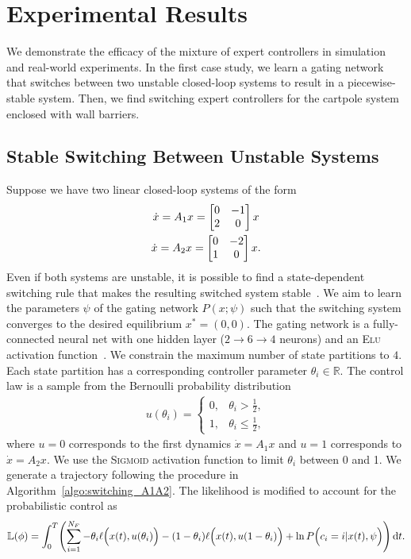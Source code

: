 \section{Experimental Results}
\label{sec:moe_results}
We demonstrate the efficacy of the mixture of expert controllers in simulation
and real-world experiments.
%
In the first case study, we learn a gating network that switches between two
unstable closed-loop systems to result in a piecewise-stable system.
%
Then, we find switching expert controllers for the cartpole system enclosed with
wall barriers.
%

\subsection{Stable Switching Between Unstable Systems}

Suppose we have two linear closed-loop systems of the form 
\begin{equation}
    \begin{gathered}
        \dot{x} = A_1x = \begin{bmatrix}0 & -1 \\ 2 & 0\end{bmatrix}x \\
        \dot{x} = A_2x = \begin{bmatrix}0 & -2 \\ 1 & 0\end{bmatrix}x.
    \end{gathered}
    \label{eq:unstable_closedloop}
\end{equation}
%
Even if both systems are unstable, it is possible to find a state-dependent
switching rule that makes the resulting switched system
stable~\cite{liberzon2003switching}. 
%
We aim to learn the parameters $\psi$ of the gating network $P(x;
\psi)$ such that the switching system converges to the desired equilibrium $x^*
= (0, 0)$.
%
The gating network is a fully-connected neural net with one hidden layer ($2
\rightarrow 6 \rightarrow 4$ neurons) and an \textsc{Elu} activation
function~\cite{clevert2015fast}.
%
We constrain the maximum number of state partitions to $4$.
%
Each state partition has a corresponding controller parameter $\theta_i \in
\mathbb{R}$. 
%
The control law is a sample from the Bernoulli probability distribution
\begin{align}
    u(\theta_i) = \begin{cases}
       0, & \theta_i > \frac{1}{2}, \\
       1, & \theta_i \leq \frac{1}{2},
    \end{cases}
\end{align}
\noindent where $u = 0$ corresponds to the first dynamics $\dot{x} = A_1
x$ and $u=1$ corresponds to $\dot{x} = A_2x$.
%
We use the \textsc{Sigmoid} activation function to limit $\theta_i$ between 0
and 1.
%
We generate a trajectory following the procedure in
Algorithm~\eqref{algo:switching_A1A2}.
%
The likelihood is modified to account for the probabilistic control as
\begin{align*}
    \mathbb{L}(\phi) = \int_{0}^{T} \Biggl( \sum_{i=1}^{N_F} - \theta_i \ell \Bigl(x(t), u(\theta_i) \Bigr) - (1- \theta_i)\ell \Bigl(x(t), u(1-\theta_i) \Bigr) +
    \ln  P\Bigl(c_i = i | x(t), \psi \Bigr)  \Biggr) \operatorname{d}\! t.
\end{align*}

